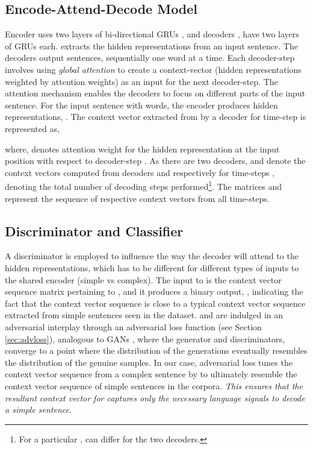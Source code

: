 \documentclass[11pt,a4paper]{article}
\begin{document}
\subsection{Encode-Attend-Decode Model}
\label{sec:enc-dec}
Encoder  uses two layers of bi-directional GRUs \cite{cho2014learning}, and decoders ,  have two layers of GRUs each.  extracts the hidden representations from an input sentence. The decoders output sentences, sequentially one word at a time. Each decoder-step involves using \textit{global attention} to create a context-vector (hidden representations weighted by attention weights) as an input for the next decoder-step. The attention mechanism enables the decoders to focus on different parts of the input sentence. For the input sentence  with  words, the encoder produces  hidden representations, . The context vector extracted from  by a decoder  for time-step  is represented as, 

where,  denotes attention weight for the hidden representation at the  input position with respect to decoder-step .
As there are two decoders,  and  denote the context vectors computed from decoders  and  respectively for time-steps ,  denoting the total number of decoding steps performed\footnote{For a particular ,  can differ for the two decoders.}. The matrices  and  represent the sequence of respective context vectors from all time-steps.


\subsection{Discriminator and Classifier}
A discriminator  is employed to influence the way the decoder  will attend to the hidden representations, which has to be different for different types of inputs to the shared encoder  (simple vs complex). The input to  is the context vector sequence matrix  pertaining to , and it produces a binary output, ,  indicating the fact that the context vector sequence is close to a typical context vector sequence extracted from simple sentences seen in the dataset.  and  are indulged in an adversarial interplay through an adversarial loss function (see Section \ref{sec:advloss}), analogous to GANs \cite{goodfellow2014generative}, where the generator and discriminators, converge to a point where the distribution of the generations eventually resembles the distribution of the genuine samples. In our case, adversarial loss tunes the context vector sequence from a complex sentence by  to ultimately resemble the context vector sequence of simple sentences in the corpora. \emph{This ensures that the resultant context vector for  captures only the necessary language signals to decode a simple sentence}.
\end{document}
